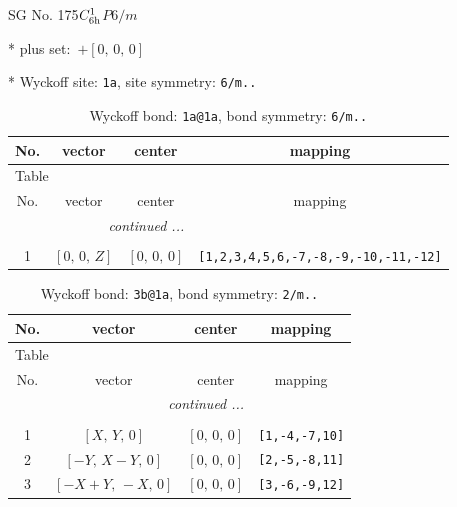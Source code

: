 \documentclass[fleqn,8pt]{jsarticle}
\begin{document}
\setcounter{MaxMatrixCols}{32}

\renewcommand{\tablename}{Table~}
\renewcommand{\figurename}{Figure~}
\begin{center}
\LARGE
SG No. 175\quad$C_{\rm 6h}^{1}$\quad$P6/m$\quad[ hexagonal ]
\end{center}

* plus set:\,\,\,$+\left[ 0,\, 0,\, 0 \right]$


* Wyckoff site: {\tt 1a}, site symmetry: {\tt 6/m..}
\renewcommand{\arraystretch}{1.2}
\begin{longtable}{cccc}
\caption{Wyckoff bond: {\tt 1a@1a}, bond symmetry: {\tt 6/m..}}
 \\
 \hline \hline
No. & vector & center & mapping \\ \hline \endfirsthead

\multicolumn{3}{l}{\tablename\ \thetable{}} \\
 \hline \hline
No. & vector & center & mapping \\ \hline \endhead

 \hline \hline
\multicolumn{3}{r}{\footnotesize\it continued ...} \\ \endfoot

 \hline \hline
\multicolumn{3}{r}{} \\ \endlastfoot

1 & $\left[ 0,\, 0,\, Z \right]$ & $\left[ 0,\, 0,\, 0 \right]$ & {\tt [1,2,3,4,5,6,-7,-8,-9,-10,-11,-12]} \\
\end{longtable}
\renewcommand{\arraystretch}{1.2}
\begin{longtable}{cccc}
\caption{Wyckoff bond: {\tt 3b@1a}, bond symmetry: {\tt 2/m..}}
 \\
 \hline \hline
No. & vector & center & mapping \\ \hline \endfirsthead

\multicolumn{3}{l}{\tablename\ \thetable{}} \\
 \hline \hline
No. & vector & center & mapping \\ \hline \endhead

 \hline \hline
\multicolumn{3}{r}{\footnotesize\it continued ...} \\ \endfoot

 \hline \hline
\multicolumn{3}{r}{} \\ \endlastfoot

1 & $\left[ X,\, Y,\, 0 \right]$ & $\left[ 0,\, 0,\, 0 \right]$ & {\tt [1,-4,-7,10]} \\ \hline
2 & $\left[ - Y,\, X - Y,\, 0 \right]$ & $\left[ 0,\, 0,\, 0 \right]$ & {\tt [2,-5,-8,11]} \\ \hline
3 & $\left[ - X + Y,\, - X,\, 0 \right]$ & $\left[ 0,\, 0,\, 0 \right]$ & {\tt [3,-6,-9,12]} \\
\end{longtable}
\end{document}
